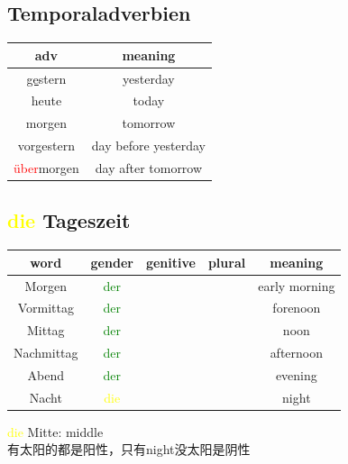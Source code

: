 \subsection{Temporaladverbien}
\begin{center}
    \begin{tabular}{|c|c|}
        \hline
        \rowcolor{gray}
        adv                         & meaning              \\
        \hline
        \underline{ge}stern         & yesterday            \\
        heute                       & today                \\
        morgen                      & tomorrow             \\
        vorgestern                  & day before yesterday \\
        \textcolor{red}{über}morgen & day after tomorrow   \\
        \hline
    \end{tabular}
\end{center}

\subsection{\textcolor{yellow}{die} Tageszeit}
\begin{center}
    \begin{tabular} {|c|c|c|c|c|}
        \hline
        \rowcolor{gray}
        word       & gender                  & genitive & plural & meaning       \\
        \hline
        Morgen     & \textcolor{green}{der}  &          &        & early morning \\
        \hline
        Vormittag  & \textcolor{green}{der}  &          &        & forenoon      \\
        \hline
        Mittag     & \textcolor{green}{der}  &          &        & noon          \\
        \hline
        Nachmittag & \textcolor{green}{der}  &          &        & afternoon     \\
        \hline
        Abend      & \textcolor{green}{der}  &          &        & evening       \\
        \hline
        Nacht      & \textcolor{yellow}{die} &          &        & night         \\
        \hline
    \end{tabular}
\end{center}
\textcolor{yellow}{die} Mitte: middle \\
有太阳的都是阳性，只有night没太阳是阴性 \\
